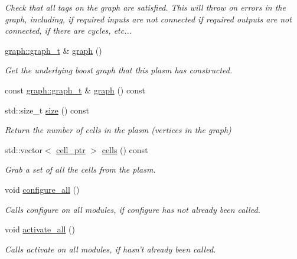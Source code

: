 \begin{DoxyCompactItemize}
\begin{DoxyCompactList}\small\item\em Check that all tags on the graph are satisfied. This will throw on errors in the graph, including, if required inputs are not connected if required outputs are not connected, if there are cycles, etc... \end{DoxyCompactList}\item 
\hyperlink{structecto_1_1graph_1_1graph__t}{graph\-::graph\-\_\-t} \& \hyperlink{structecto_1_1plasm_a4f8de02440afdad0aa395fbaea03399e}{graph} ()
\begin{DoxyCompactList}\small\item\em Get the underlying boost graph that this plasm has constructed. \end{DoxyCompactList}\item 
const \hyperlink{structecto_1_1graph_1_1graph__t}{graph\-::graph\-\_\-t} \& \hyperlink{structecto_1_1plasm_ac6cde6d1d615e85f442ce299fdf0e7a0}{graph} () const 
\item 
std\-::size\-\_\-t \hyperlink{structecto_1_1plasm_aaeeabeb3f78c1a7291eb14e0f705574e}{size} () const 
\begin{DoxyCompactList}\small\item\em Return the number of cells in the plasm (vertices in the graph) \end{DoxyCompactList}\item 
std\-::vector$<$ \hyperlink{namespaceecto_aed1809e82b9229ea81ef9ee3438cf62c}{cell\-\_\-ptr} $>$ \hyperlink{structecto_1_1plasm_aa7724234d631563b10de07030c066e01}{cells} () const 
\begin{DoxyCompactList}\small\item\em Grab a set of all the cells from the plasm. \end{DoxyCompactList}\item 
void \hyperlink{structecto_1_1plasm_a55d56445bd1d09b9422390fb49e81bec}{configure\-\_\-all} ()
\begin{DoxyCompactList}\small\item\em Calls configure on all modules, if configure has not already been called. \end{DoxyCompactList}\item 
void \hyperlink{structecto_1_1plasm_a4419135c6c8dd8bb0cc7f4807a025df2}{activate\-\_\-all} ()
\begin{DoxyCompactList}\small\item\em Calls activate on all modules, if hasn't already been called. \end{DoxyCompactList}\item 

\end{DoxyCompactItemize}
